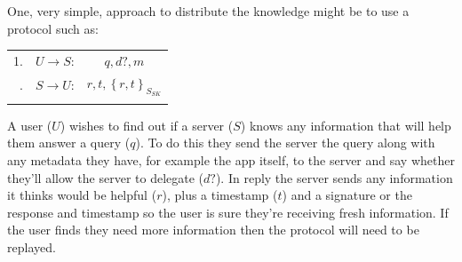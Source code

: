 \documentclass[a4paper]{scrartcl}
\begin{document}
One, very simple, approach to distribute the knowledge might be to use a protocol such as:
\begin{center}
  \begin{tabular}{rrc}
    \toprule
    1. & $U \longrightarrow S$:        & $q, d?, m$ \\ \addlinespace
    2. & $S \longrightarrow U$:        & $r, t,  \left\{ r, t \right\}_{S_{SK}}$  \\ \addlinespace
    \bottomrule
  \end{tabular}
\end{center}
A user ($U$) wishes to find out if a server ($S$) knows any information that will help them answer a query ($q$).
To do this they send the server the query along with any metadata they have, for example the app itself, to the server and say whether they'll allow the server to delegate ($d?$).
In reply the server sends any information it thinks would be helpful ($r$), plus a timestamp ($t$) and a signature or the response and timestamp so the user is sure they're receiving fresh information.
If the user finds they need more information then the protocol will need to be replayed.
\end{document}
